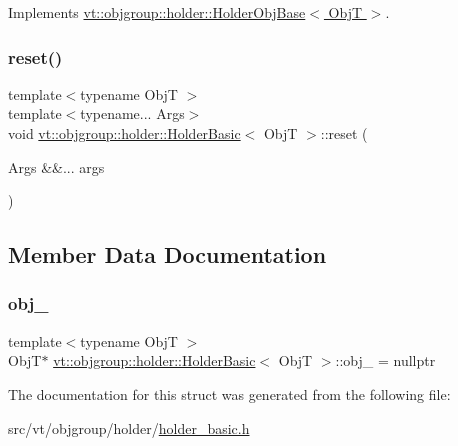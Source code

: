 Implements \hyperlink{structvt_1_1objgroup_1_1holder_1_1_holder_obj_base_a4b350b0126259d31a62fd426a08f6698}{vt\+::objgroup\+::holder\+::\+Holder\+Obj\+Base$<$ Obj\+T $>$}.

\mbox{\label{structvt_1_1objgroup_1_1holder_1_1_holder_basic_ae0e03732280c6c1cf44f9ff8f24426c2}} 
\subsubsection{\texorpdfstring{reset()}{reset()}}
{\footnotesize\ttfamily template$<$typename ObjT $>$ \\
template$<$typename... Args$>$ \\
void \hyperlink{structvt_1_1objgroup_1_1holder_1_1_holder_basic}{vt\+::objgroup\+::holder\+::\+Holder\+Basic}$<$ ObjT $>$\+::reset (\begin{DoxyParamCaption}\item[{Args \&\&...}]{args }\end{DoxyParamCaption})\hspace{0.3cm}{\ttfamily [inline]}}



\subsection{Member Data Documentation}
\mbox{\label{structvt_1_1objgroup_1_1holder_1_1_holder_basic_a2313dfbdc994c52b649ee2fc666f1219}} 
\subsubsection{\texorpdfstring{obj\+\_\+}{obj\_}}
{\footnotesize\ttfamily template$<$typename ObjT $>$ \\
ObjT$\ast$ \hyperlink{structvt_1_1objgroup_1_1holder_1_1_holder_basic}{vt\+::objgroup\+::holder\+::\+Holder\+Basic}$<$ ObjT $>$\+::obj\+\_\+ = nullptr\hspace{0.3cm}{\ttfamily [private]}}



The documentation for this struct was generated from the following file\+:\begin{DoxyCompactItemize}
\item 
src/vt/objgroup/holder/\hyperlink{holder__basic_8h}{holder\+\_\+basic.\+h}\end{DoxyCompactItemize}
